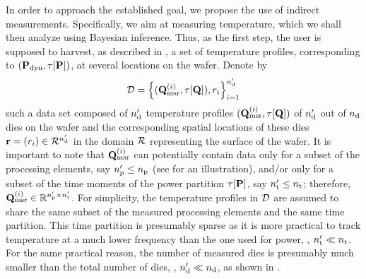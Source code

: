 In order to approach the established goal, we propose the use of indirect measurements.
Specifically, we aim at measuring temperature, which we shall then analyze using Bayesian inference.
Thus, as the first step, the user is supposed to harvest, as described in , a set of temperature profiles, corresponding to $(\mathbf{P}_{\text{dyn}}, \tau[\mathbf{P}])$, at several locations on the wafer. Denote by
\[
  \mathcal{D} = \left\{ (\mathbf{Q}^{(i)}_{\text{msr}}, \tau[\mathbf{Q}]), r_i \right\}_{i = 1}^{n_\text{d}'}
\]
such a data set composed of ${n_\text{d}'}$ temperature profiles $(\mathbf{Q}^{(i)}_{\text{msr}}, \tau[\mathbf{Q}])$ of ${n_\text{d}'}$ out of ${n_\text{d}}$ dies on the wafer and the corresponding spatial locations of these dies $\mathbf{r} = (r_i) \in \mathcal{R}^{n_\text{d}'}$ in the domain $\mathcal{R}$ representing the surface of the wafer.
It is important to note that $\mathbf{Q}^{(i)}_{\text{msr}}$ can potentially contain data only for a subset of the processing elements, say ${n_\text{p}'} \leq {n_\text{p}}$ (see  for an illustration), and/or only for a subset of the time moments of the power partition $\tau[\mathbf{P}]$, say ${n_\text{t}'} \leq {n_\text{t}}$; therefore, $\mathbf{Q}^{(i)}_{\text{msr}} \in \mathbb{R}^{{n_\text{p}'} \times {n_\text{t}'}}$.
For simplicity, the temperature profiles in $\mathcal{D}$ are assumed to share the same subset of the measured processing elements and the same time partition.
This time partition is presumably sparse as it is more practical to track temperature at a much lower frequency than the one used for power, \ie, ${n_\text{t}'} \ll {n_\text{t}}$.
For the same practical reason, the number of measured dies is presumably much smaller than the total number of dies, \ie, ${n_\text{d}'} \ll {n_\text{d}}$, as shown in .
